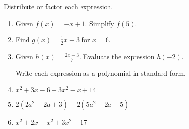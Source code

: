 \documentclass[12pt, twoside]{article}
\begin{document}
Distribute or factor each expression.
\begin{enumerate}
  \subsubsection*{Factoring Fridays}


\newpage
  \item Given $f(x)=-x+1$. Simplify $f(5)$. \vspace{2cm}
  \item Find $g(x)=\frac{1}{2} x-3$ for $x=6$. \vspace{2.5cm}
  \item Given $\displaystyle h(x)=\frac{2x-3}{7}$. Evaluate the expression $h(-2)$. \vspace{4cm}

  Write each expression as a polynomial in standard form.
  \item $x^2+3x -6 -3x^2-x+14$ \vspace{3cm}
  \item $2(2a^2-2a +3) -2(5a^2-2a-5)$ \vspace{3cm}
  \item $x^2+2x-x^2 +3x^2-17$ \vspace{3cm}



\end{enumerate}
\end{document}
